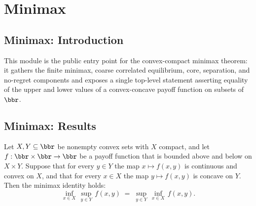 \section{Minimax}
\subsection*{Minimax: Introduction}

This module is the public entry point for the convex-compact minimax theorem: it
gathers the finite minimax, coarse correlated equilibrium, core, separation, and
no-regret components and exposes a single top-level statement asserting equality
of the upper and lower values of a convex-concave payoff function on subsets
of~$\bbr$.

\subsection*{Minimax: Results}

\begin{theorem}
\label{OnlineLearning.convex_compact_minimax}
\leanok
{}
Let $X, Y \subseteq \bbr$ be nonempty convex sets with $X$ compact, and let $f : \bbr
\times \bbr \to \bbr$ be a payoff function that is bounded above and below on $X \times
Y$. Suppose that for every $y \in Y$ the map $x \mapsto f(x,y)$ is continuous and convex
on $X$, and that for every $x \in X$ the map $y \mapsto f(x,y)$ is concave on $Y$. Then
the minimax identity holds:
\[
  \inf_{x \in X}\,\sup_{y \in Y}\, f(x,y)
  \;=\;
  \sup_{y \in Y}\,\inf_{x \in X}\, f(x,y).
\]
\end{theorem}
